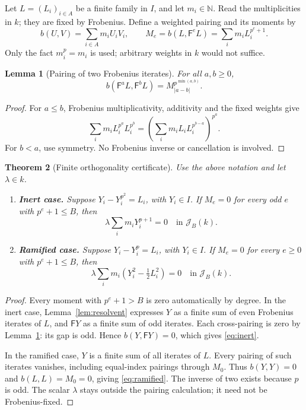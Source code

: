 \documentclass[11pt,letterpaper]{article}
\newtheorem{theorem}{Theorem}[section]
\newtheorem{lemma}[theorem]{Lemma}
\theoremstyle{remark}
\newcommand{\JJ}{\mathcal J}
\newcommand{\FF}{\mathsf F}
\begin{document}
Let \(L=(L_i)_{i\in A}\) be a finite family in \(I\), and let
\(m_i\in\mathbb N\). Read the multiplicities in \(k\); they are fixed by
Frobenius. Define a weighted pairing and its moments by
\[
 b(U,V)=\sum_{i\in A}m_iU_iV_i,\qquad
 M_e=b(L,\FF^eL)=\sum_i m_iL_i^{p^e+1}.
\]
Only the fact \(m_i^p=m_i\) is used; arbitrary weights in \(k\) would not
suffice.

\begin{lemma}[Pairing of two Frobenius iterates]
\label{lem:pairing}
For all \(a,b\ge0\),
\begin{equation}
 b(\FF^a L,\FF^b L)
     =M_{|a-b|}^{p^{\min(a,b)}}. \label{eq:pairing}
\end{equation}
\end{lemma}
\begin{proof}
For \(a\le b\), Frobenius multiplicativity, additivity and the fixed weights give
\[
 \sum_i m_iL_i^{p^a}L_i^{p^b}
 =\left(\sum_i m_iL_iL_i^{p^{b-a}}\right)^{p^a}.
\]
For \(b<a\), use symmetry. No Frobenius inverse or cancellation is involved.
\end{proof}

\begin{theorem}[Finite orthogonality certificate]
\label{thm:orthogonality}
Use the above notation and let \(\lambda\in k\).
\begin{enumerate}
\item \textbf{Inert case.} Suppose \(Y_i-Y_i^{p^2}=L_i\), with \(Y_i\in I\).
If \(M_e=0\) for every odd \(e\) with \(p^e+1\le B\), then
\begin{equation}
 \lambda\sum_i m_iY_i^{p+1}=0\quad\text{in }\JJ_B(k). \label{eq:inert}
\end{equation}
\item \textbf{Ramified case.} Suppose \(Y_i-Y_i^p=L_i\), with \(Y_i\in I\).
If \(M_e=0\) for every \(e\ge0\) with \(p^e+1\le B\), then
\begin{equation}
 \lambda\sum_i m_i\left(Y_i^2-\tfrac12L_i^2\right)=0
 \quad\text{in }\JJ_B(k). \label{eq:ramified}
\end{equation}
\end{enumerate}
\end{theorem}
\begin{proof}
Every moment with \(p^e+1>B\) is zero automatically by degree. In the inert
case, Lemma~\ref{lem:resolvent} expresses \(Y\) as a finite sum of even
Frobenius iterates of \(L\), and \(\FF Y\) as a finite sum of odd iterates.
Each cross-pairing is zero by Lemma~\ref{lem:pairing}: its gap is odd. Hence
\(b(Y,\FF Y)=0\), which gives \eqref{eq:inert}.

In the ramified case, \(Y\) is a finite sum of all iterates of \(L\). Every
pairing of such iterates vanishes, including equal-index pairings through
\(M_0\). Thus \(b(Y,Y)=0\) and \(b(L,L)=M_0=0\), giving
\eqref{eq:ramified}. The inverse of two exists because \(p\) is odd. The scalar
\(\lambda\) stays outside the pairing calculation; it need not be Frobenius-fixed.
\end{proof}
\end{document}
